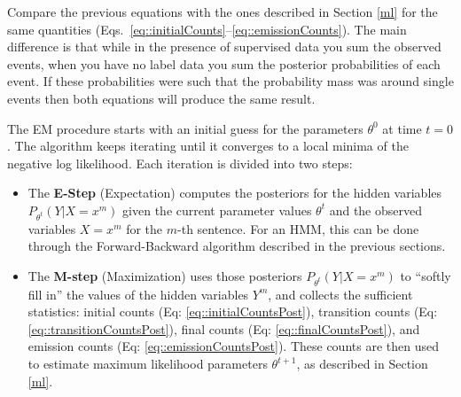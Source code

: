
Compare the previous equations with the ones described in Section
\ref{ml} for the same quantities (Eqs.~\ref{eq::initialCounts}--\ref{eq::emissionCounts}). The main difference is that while in
the presence of supervised data you sum the observed events, when you
have no label data you sum the posterior probabilities of each
event. If these probabilities were such that the probability mass was
around single events then both equations will produce the same result.



The EM procedure starts with an initial guess for the parameters
$\theta^0$ at time $t = 0$. The algorithm keeps iterating 
until it converges to a local minima of the negative log likelihood. Each
iteration is divided into two steps:
\begin{itemize} 
 \item The {\bf{E-Step}} (Expectation) 
computes the posteriors for the hidden variables $P_{\theta^t}(Y|X=x^m)$
given the current parameter values $\theta^t$ and the observed variables $X=x^m$ for the $m$-th sentence. 
For an HMM, this can be done through the Forward-Backward algorithm described in the previous sections.
\item The {\bf{M-step}} (Maximization) uses those posteriors $P_{\theta^t}(Y|X=x^m)$ to
``softly fill in'' the values of the hidden variables $Y^m$, and
collects the sufficient statistics: initial counts (Eq: \ref{eq::initialCountsPost}), transition counts (Eq:
\ref{eq::transitionCountsPost}), 
final counts  (Eq: \ref{eq::finalCountsPost}),
and emission counts (Eq: \ref{eq::emissionCountsPost}). These
counts are then used to estimate maximum likelihood parameters $\theta^{t+1}$, as described in
Section \ref{ml}.
\end{itemize}


